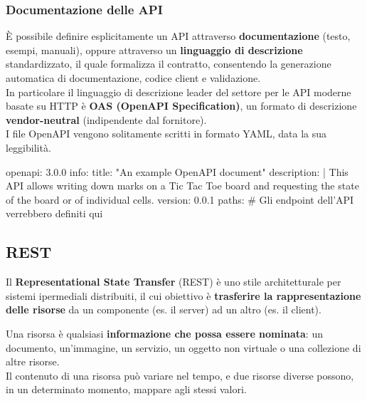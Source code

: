 \documentclass[12pt]{article}
\begin{document}
\subsubsection{Documentazione delle API}
È possibile definire esplicitamente un API attraverso \textbf{documentazione} (testo, esempi, manuali),
oppure attraverso un \textbf{linguaggio di descrizione} standardizzato, il quale formalizza il contratto, consentendo la generazione automatica di documentazione, codice client e validazione.\\
In particolare il linguaggio di descrizione leader del settore per le API moderne basate su HTTP è \textbf{OAS (OpenAPI Specification)}, un formato di descrizione \textbf{vendor-neutral} (indipendente dal fornitore).\\
I file OpenAPI vengono solitamente scritti in formato YAML, data la sua leggibilità.
\begin{code}[language=YAML]
  openapi: 3.0.0
  info:
    title: "An example OpenAPI document"
    description: |
      This API allows writing down marks on a Tic Tac Toe board
      and requesting the state of the board or of individual cells.
    version: 0.0.1
  paths: {} # Gli endpoint dell'API verrebbero definiti qui
\end{code}

\subsection{REST}
Il \textbf{Representational State Transfer} (REST) è uno stile architetturale per sistemi ipermediali distribuiti,
il cui obiettivo è \textbf{trasferire la rappresentazione delle risorse} da un componente (es. il server) ad un altro (es. il client).
\begin{definition}[Risorsa]
Una risorsa è qualsiasi \textbf{informazione che possa essere nominata}:
un documento, un'immagine, un servizio, un oggetto non virtuale o una collezione di altre risorse.\\
Il contenuto di una risorsa può variare nel tempo, e due risorse diverse possono, in un determinato momento, mappare agli stessi valori.
\end{definition}
\end{document}
